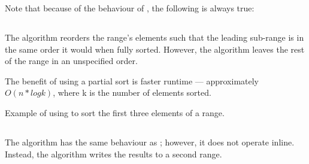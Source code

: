 Note that because of the behaviour of , the following is always true:\\
\begin{small}\end{small}

\subsection{\texorpdfstring{}{\texttt{std::partial\_sort}}}

The  algorithm reorders the range's elements such that the leading sub-range is in the same order it would when fully sorted. However, the algorithm leaves the rest of the range in an unspecified order.



The benefit of using a partial sort is faster runtime — approximately $O(n*logk)$, where k is the number of elements sorted.

\begin{codebox}[]{\href{https://compiler-explorer.com/z/j6xjM4GnT}{\ExternalLink}}
\footnotesize Example of using  to sort the first three elements of a range.
\tcblower
{}
\end{codebox}

\subsection{\texorpdfstring{}{\texttt{std::partial\_sort\_copy}}}

The  algorithm has the same behaviour as \linebreak{}; however, it does not operate inline. Instead, the algorithm writes the results to a second range.


